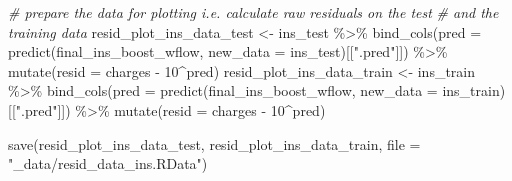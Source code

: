 \documentclass[
]{book}
\newenvironment{Shaded}{\begin{snugshade}}{\end{snugshade}}
\newcommand{\AttributeTok}[1]{\textcolor[rgb]{0.77,0.63,0.00}{#1}}
\newcommand{\CommentTok}[1]{\textcolor[rgb]{0.56,0.35,0.01}{\textit{#1}}}
\newcommand{\DecValTok}[1]{\textcolor[rgb]{0.00,0.00,0.81}{#1}}
\newcommand{\FunctionTok}[1]{\textcolor[rgb]{0.00,0.00,0.00}{#1}}
\newcommand{\NormalTok}[1]{#1}
\newcommand{\OtherTok}[1]{\textcolor[rgb]{0.56,0.35,0.01}{#1}}
\newcommand{\SpecialCharTok}[1]{\textcolor[rgb]{0.00,0.00,0.00}{#1}}
\newcommand{\StringTok}[1]{\textcolor[rgb]{0.31,0.60,0.02}{#1}}
\begin{document}
\begin{Shaded}
\begin{Highlighting}[]
\CommentTok{\# prepare the data for plotting i.e. calculate raw residuals on the test }
\CommentTok{\# and the training data}
\NormalTok{resid\_plot\_ins\_data\_test }\OtherTok{\textless{}{-}}\NormalTok{ ins\_test }\SpecialCharTok{\%\textgreater{}\%}
  \FunctionTok{bind\_cols}\NormalTok{(}\AttributeTok{pred =} \FunctionTok{predict}\NormalTok{(final\_ins\_boost\_wflow, }\AttributeTok{new\_data =}\NormalTok{ ins\_test)[[}\StringTok{".pred"}\NormalTok{]]) }\SpecialCharTok{\%\textgreater{}\%}
  \FunctionTok{mutate}\NormalTok{(}\AttributeTok{resid =}\NormalTok{ charges }\SpecialCharTok{{-}} \DecValTok{10}\SpecialCharTok{\^{}}\NormalTok{pred)}
\NormalTok{resid\_plot\_ins\_data\_train }\OtherTok{\textless{}{-}}\NormalTok{ ins\_train }\SpecialCharTok{\%\textgreater{}\%}
  \FunctionTok{bind\_cols}\NormalTok{(}\AttributeTok{pred =} \FunctionTok{predict}\NormalTok{(final\_ins\_boost\_wflow, }\AttributeTok{new\_data =}\NormalTok{ ins\_train)[[}\StringTok{".pred"}\NormalTok{]]) }\SpecialCharTok{\%\textgreater{}\%}
  \FunctionTok{mutate}\NormalTok{(}\AttributeTok{resid =}\NormalTok{ charges }\SpecialCharTok{{-}} \DecValTok{10}\SpecialCharTok{\^{}}\NormalTok{pred)}

\FunctionTok{save}\NormalTok{(resid\_plot\_ins\_data\_test,}
\NormalTok{     resid\_plot\_ins\_data\_train,}
     \AttributeTok{file =} \StringTok{"\_data/resid\_data\_ins.RData"}\NormalTok{)}


\end{Highlighting}
\end{Shaded}
\end{document}
